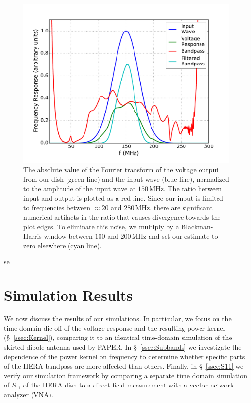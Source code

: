 \documentclass[twocolumn]{emulateapj}
\begin{document}
\begin{figure}[h!]
\includegraphics[width=.5\textwidth]{figures/frequency_domain.pdf}
\caption{The absolute value of the Fourier transform of the voltage output from our dish (green line) and the input wave (blue line), normalized to the amplitude of the input wave at $150$\,MHz. The ratio between input and output is plotted as a red line. Since our input is limited to frequencies between $\approx 20$ and $280$\,MHz, there are significant numerical artifacts in the ratio that causes divergence towards the plot edges. To eliminate this noise, we multiply by a Blackman-Harris window between $100$ and $200$\,MHz and set our estimate to zero elsewhere (cyan line).}
\label{fig:FrequencyDomain}
\end{figure}


se\section{Simulation Results}\label{sec:Results}

We now discuss the results of our simulations. In particular, we focus on the time-domain die off of the voltage response and the resulting power kernel (\S~\ref{ssec:Kernel}), comparing it to an identical time-domain simulation of the skirted dipole antenna used by PAPER. In \S~\ref{ssec:Subbands} we investigate the dependence of the power kernel on frequency to determine whether specific parts of the HERA bandpass are more affected than others. Finally, in \S~\ref{ssec:S11} we verify our simulation framework by comparing a separate time domain simulation of $S_{11}$ of the HERA dish to a direct field measurement with a vector network analyzer (VNA). 
\end{document}
